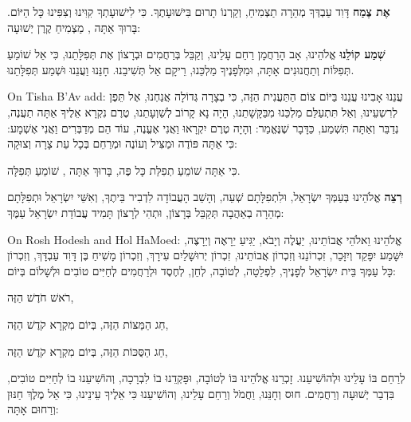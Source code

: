 \textbf{אֶת צֶמַח} דָּוִד עַבְדְּךָ מְהֵרָה תַצְמִיחַ, וְקַרְנוֹ תָרוּם בִּישׁוּעָתֶךָ. כִּי לִישׁוּעָתְךָ קִוִּינוּ וְצִפִּינוּ כָּל הַיּוֹם. בָּרוּךְ אַתָּה \Shem{}, מַצְמִיחַ קֶרֶן יְשׁוּעָה:

\textbf{שְׁמַע קוֹלֵנוּ} \Shem{} אֱלֹהֵינוּ, אָב הָרַחֲמָן רַחֵם עָלֵינוּ, וְקַבֵּל בְּרַחֲמִים וּבְרָצוֹן אֶת תְּפִלָּתֵנוּ, כִּי אֵל שׁוֹמֵעַ תְּפִלּוֹת וְתַחֲנוּנִים אָתָּה, וּמִלְּפָנֶיךָ מַלְכֵּנוּ, רֵיקָם אַל תְּשִׁיבֵנוּ. חָנֵּנוּ וַעֲנֵנוּ וּשְׁמַע תְּפִלָּתֵנוּ.

\begin{seasonal}{On Tisha B'Av add:}
עֲנֵנוּ אָבִינוּ עֲנֵנוּ בַּיּוֹם צוֹם הַתַּעֲנִית הַזֶּה, כִּי בְצָרָה גְּדוֹלָה אֲנַחְנוּ, אֶל תֵּפֶן לְרִשְעֵינוּ, וְאַל תִּתְעַלַּם מַלְכֵּנוּ מִבַּקָּשָׁתֵנוּ, הָיָה נָא קָרוֹב לְשַׁוְעָתֵנוּ, טֶרֶם נִקְרָא אֵלֶיךָ אַתָּה תַעֲנֶה, נְדַבֵּר וְאַתָּה תִּשְׁמַע, כַּדָּבָר שֶׁנֶּאֱמַר: וְהָיָה טֶרֶם יִקְרָאוּ וַאֲנִי אֶעֱנֶה, עוֹד הֵם מְדַבְּרִים וַאֲנִי אֶשְׁמָע: כִּי אַתָּה \Shem{} פּוֹדֶה וּמַצִּיל וְעוֹנֶה וּמְרַחֵם בְּכָל עֵת צָרָה וְצוּקָה:
\end{seasonal}

כִּי אַתָּה שׁוֹמֵעַ תְפִלַּת כָּל פֶּה, בָּרוּךְ אַתָּה \Shem{}, שׁוֹמֵעַ תְּפִלָּה.

\textbf{רְצֵה} \Shem{} אֱלֹהֵינוּ בְּעַמְּךָ יִשְׂרָאֵל, וּלִתְפִלָּתָם שְׁעֵה, וְהָשֵׁב הָעֲבוֹדָה לִדְבִיר בֵּיתֶךָ, וְאִשֵּׁי יִשְׂרָאֵל וּתְפִלָּתָם מְהֵרָה בְאַהֲבָה תְּקַבֵּל בְּרָצוֹן, וּתְהִי לְרָצוֹן תָּמִיד עֲבוֹדַת יִשְׂרָאֵל עַמֶּךָ:

\begin{seasonal}{On Rosh Hodesh and Hol HaMoed:}
אֱלֹהֵינוּ וֵאלֹהֵי אֲבוֹתֵינוּ, יַעֲלֶה וְיָבֹא, יַגִּיעַ יֵרָאֶה וְיֵרָצֶה, יִשָּׁמַע יִפָּקֵד וְיִזָּכֵר, זִכְרוֹנֵנוּ וְזִכְרוֹן אֲבוֹתֵינוּ, זִכְרוֹן יְרוּשָׁלַיִם עִירָךְ, וְזִכְרוֹן מָשִׁיחַ בֶּן דָּוִד עַבְדָּךְ, וְזִכְרוֹן כָּל עַמְּךָ בֵּית יִשְׂרָאֵל לְפָנֶיךָ, לִפְלֵטָה, לְטוֹבָה, לְחֵן, לְחֶסֶד וּלְרַחֲמִים לְחַיִּים טוֹבִים וּלְשָׁלוֹם בְּיוֹם:

רֹאשׁ חֹדֶשׁ הַזֶּה,

חַג הַמַּצּוֹת הַזֶּה, בְּיוֹם מִקְרָא קֹדֶשׁ הַזֶּה,

חַג הַסֻּכּוֹת הַזֶּה, בְּיוֹם מִקְרָא קֹדֶשׁ הַזֶּה,

לְרַחֵם בּוֹ עָלֵינוּ וּלְהוֹשִׁיעֵנוּ. זָכְרֵנוּ \Shem{} אֱלֹהֵינוּ בּוֹ לְטוֹבָה, וּפָּקְדֵנוּ בוֹ לִבְרָכָה, וְהוֹשִׁיעֵנוּ בוֹ לְחַיִּים טוֹבִים, בִּדְבַר יְשׁוּעָה וְרַחֲמִים. חוּס וְחָנֵּנוּ, וַחֲמֹל וְרַחֵם עָלֵינוּ, וְהוֹשִׁיעֵנוּ כִּי אֵלֶיךָ עֵינֵינוּ, כִּי אֵל מֶלֶךְ חַנּוּן וְרַחוּם אָתָּה:
\end{seasonal}

